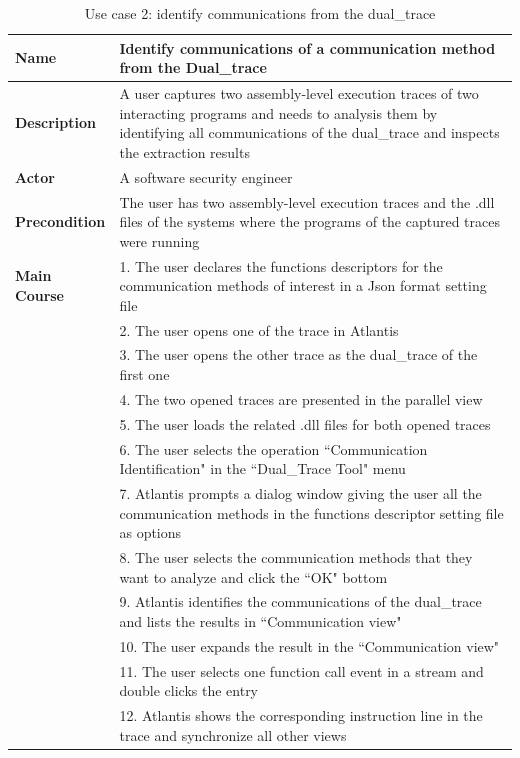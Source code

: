 \begin{table}[H]
  \centering
  \caption{Use case 2: identify communications from the dual\_trace}
  \label{usecase2}
  \begin{tabular}{|l|p{13cm}|}
      \hline
       \textbf{Name} & Identify communications of a communication method from the Dual\_trace\\
       \hline
       \textbf{Description} & A user captures two assembly-level execution traces of two interacting programs and needs to analysis them by identifying all communications of the dual\_trace and inspects the extraction results \\
       \hline
              \textbf{Actor} & A software security engineer \\
       \hline
      \textbf{Precondition} & The user has two assembly-level execution traces and the .dll files of the systems where the programs of the captured traces were running\\
       \hline
       \textbf{Main Course}& 1. The user declares the functions descriptors for the communication methods of interest in a Json format setting file\\
        & 2. The user opens one of the trace in Atlantis\\
       &  3. The user opens the other trace as the dual\_trace of the first one\\
       & 4. The two opened traces are presented in the parallel view\\
       & 5. The user loads the related .dll files for both opened traces\\
       & 6. The user selects the operation ``Communication Identification" in the ``Dual\_Trace Tool" menu\\
      & 7. Atlantis prompts a dialog window giving the user all the communication methods in the functions descriptor setting file as options\\
       & 8. The user selects the communication methods that they want to analyze and click the ``OK" bottom\\
       & 9. Atlantis identifies the communications of the dual\_trace and lists the results in ``Communication view"\\
       & 10. The user expands the result in the ``Communication view"\\
       & 11. The user selects one function call event in a stream and double clicks the entry\\
       & 12. Atlantis shows the corresponding instruction line in the trace and synchronize all other views\\
      \hline               
  \end{tabular}
\end{table}

